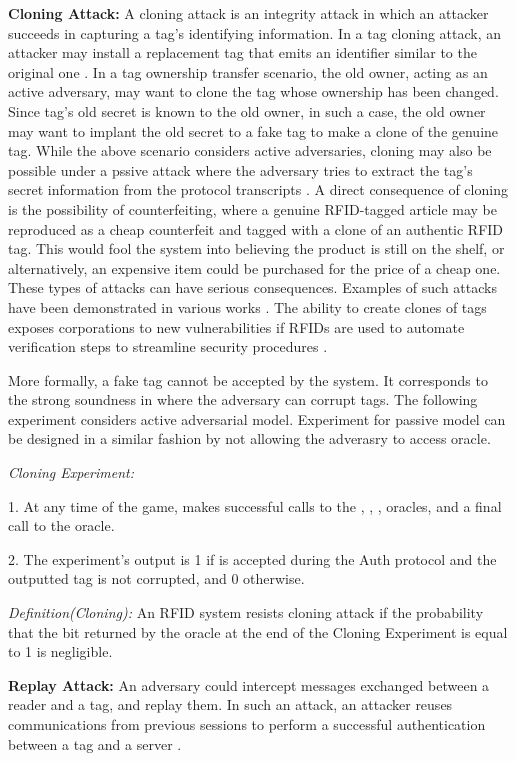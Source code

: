 \documentclass{easychair}
\begin{document}
\textbf{Cloning Attack:} A cloning attack is an integrity attack in which an attacker succeeds in
capturing a tag's identifying information. In a tag cloning attack, an attacker may
install a replacement tag that emits an identifier similar to
the original one \cite{dot}. In a tag ownership transfer scenario, the old owner, acting as an active adversary, may want to clone the tag whose ownership has been changed. Since tag's old secret is known to the old owner, in such a case, the old owner may want to implant the old secret to a fake tag to make a clone of the genuine tag. While the above scenario considers active adversaries, cloning may also be possible under a pssive attack where the adversary tries to extract the tag's secret information from the protocol transcripts \cite{burmester}. A direct consequence of cloning is the possibility of counterfeiting, where a genuine RFID-tagged article may be reproduced as a cheap counterfeit and tagged with a clone of an authentic RFID tag. This would fool the system into believing
the product is still on the shelf, or alternatively, an expensive
item could be purchased for the price of a cheap one. These
types of attacks can have serious consequences. Examples of
such attacks have been demonstrated in various works \cite{cloning1,cloning2}.
The ability to create clones of tags exposes corporations to new vulnerabilities if RFIDs are
used to automate verification steps to streamline security procedures \cite{burmester}. 

More formally, a fake tag cannot be accepted by the
system. It corresponds to the strong soundness in \cite{damgard} where the adversary can
corrupt tags. The following experiment considers active adversarial model. Experiment for passive model can be designed in a similar fashion by not allowing the adverasry to access  oracle.

\textit{Cloning Experiment:}

1. At any time of the game,  makes successful calls to the  , , ,  oracles, and a final call to the  oracle.

2. The experiment's output is 1 if  is accepted during the Auth protocol and
the outputted tag is not corrupted, and 0 otherwise.

\textit{Definition(Cloning):} An RFID system resists cloning attack if the probability that
the bit  returned by the  oracle at the end of the Cloning Experiment
is equal to 1 is negligible.


\textbf{Replay Attack:} An adversary could intercept messages exchanged between a
reader and a tag, and replay them. In such an attack, an attacker reuses
communications from previous sessions to perform a
successful authentication between a tag and a server \cite{replay,sm:bp}.
\end{document}
